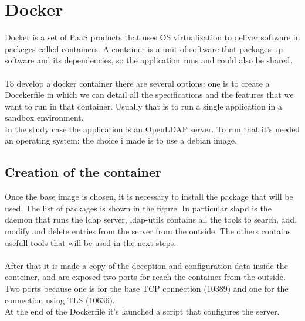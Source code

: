 \chapter{Docker}
Docker is a set of PaaS products that uses OS virtualization to deliver software in packeges called containers. A container is a unit of software that packages up software and its dependencies, so the application runs and could also be shared. 
\\\\
To develop a docker container there are several options: one is to create a Docekerfile in which we can detail all the specifications and the features that we want to run in that container. Usually that is to run a single application in a sandbox environment.  
\\
In the study case the application is an OpenLDAP server. To run that it’s needed an operating system: the choice i made is to use a debian image.
\section{Creation of the container}

Once the base image is chosen, it is necessary to install the package that will be used. The list of packages is shown in the figure. In particular slapd is the daemon that runs the ldap server, ldap-utils contains all the tools to search, add, modify and delete entries from the server from the outside. The others contains usefull tools that will be used in the next steps.  
\\
\\
After that it is made a copy of the deception and configuration data inside the conteiner, and are exposed two ports for reach the container from the outside. Two ports because one is for the base TCP connection (10389) and one for the connection using TLS (10636). 
\\
At the end of the Dockerfile it’s launched a script that configures the server.
